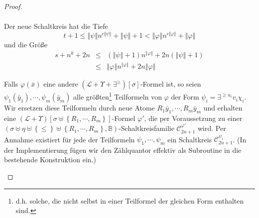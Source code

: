 \begin{proof}
\begin{casenv}
\begin{eqnarray*}
\end{eqnarray*}
Der neue Schaltkreis hat die Tiefe 
\[
t+1\leqslant\left\Vert \psi\right\Vert n^{c\left\Vert \psi\right\Vert }+\left\Vert \psi\right\Vert +1<\left\Vert \varphi\right\Vert n^{c\left\Vert \varphi\right\Vert }+\left\Vert \varphi\right\Vert 
\]
 und die Größe 
\begin{eqnarray*}
s+n^{k}+2n & \leqslant & \left(\left\Vert \psi\right\Vert +1\right)n^{\left\Vert \varphi\right\Vert }+2n\left(\left\Vert \psi\right\Vert +1\right)\\
 & \leqslant & \left\Vert \varphi\right\Vert n^{\left\Vert \varphi\right\Vert }+2n\left\Vert \varphi\right\Vert 
\end{eqnarray*}

\item \label{case:counting3}Falls $\varphi\left(\bar{x}\right)$ eine andere
$\left(\mathcal{L}+\Upsilon+\exists^{\geqslant}\right)\left[\sigma\right]$-Formel
ist, so seien $\psi_{1}\left(\bar{y}_{1}\right),\cdots,\psi_{m}\left(\bar{y}_{m}\right)$
alle größten\footnote{d.h. solche, die nicht selbst in einer Teilformel der gleichen Form
enthalten sind.} Teilformeln von $\varphi$ der Form $\psi_{i}=\exists^{\geqslant u_{i}}v_{i}\chi_{i}$.
Wir ersetzen diese Teilformeln durch neue Atome $R_{1}\bar{y}_{1},\cdots,R_{m}\bar{y}_{m}$
und erhalten eine $\left(\mathcal{L}+\Upsilon\right)\left[\sigma\uplus\left\{ R_{1},\cdots,R_{m}\right\} \right]$-Formel
$\varphi'$, die per Voraussetzung zu einer $\left(\sigma\uplus\eta\uplus\left\{ \leqslant\right\} \uplus\left\{ R_{1},\cdots,R_{m}\right\} ,\mathbb{B}\right)$-Schaltkreisfamilie
$\mathcal{C}_{2n+1}^{\varphi'}$ wird. Per Annahme existiert für jede
der Teilformeln $\psi_{1},\cdots,\psi_{m}$ ein Schaltkreis $\mathcal{C}_{2n+1}^{\psi_{i}}$.
(In der Implementierung fügen wir den Zählquantor effektiv als Subroutine
in die bestehende Konstruktion ein.)


\end{casenv}
\end{proof}
